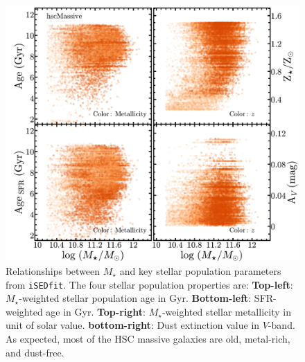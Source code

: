 \documentclass[fleqn,usenatbib]{mnras}
\def\mstar{{$M_{\star}$}}
\begin{document}
    \begin{figure}
        \begin{center}
        \includegraphics[width=12cm]{fig/redbcg_isedfit_2.pdf}
        \caption{
            Relationships between \mstar{} and key stellar population parameters from 
            \texttt{iSEDfit}. 
            The four stellar population properties are: 
            \textbf{Top-left}: \mstar{}-weighted stellar population age 
            in Gyr. 
            \textbf{Bottom-left}: SFR-weighted age in Gyr. 
            \textbf{Top-right}: \mstar{}-weighted stellar metallicity in 
            unit of solar value.
            \textbf{bottom-right}: Dust extinction value in $V$-band.
            As expected, most of the HSC massive galaxies are old, metal-rich, and 
            dust-free. 
            }
        \label{fig:ised_2}
        \end{center}
    \end{figure}
\end{document}
